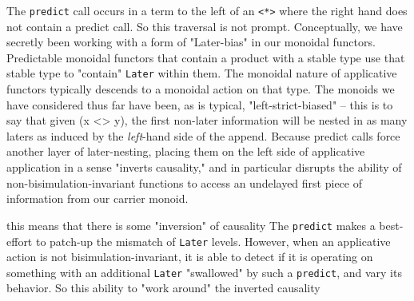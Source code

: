 \documentclass[hoptionsi,review,format=sigplan]{acmart}
\newcommand{\hs}{\texttt}
\begin{document}
The \hs{predict} call occurs in a term to the left of an \hs{<*>} where the right hand does not contain a predict call. So this traversal is not prompt. Conceptually, we have secretly been working with a form of "Later-bias" in our monoidal functors. Predictable monoidal functors that contain a product with a stable type use that stable type to "contain" \hs{Later} within them. The monoidal nature of applicative functors typically descends to a monoidal action on that type. The monoids we have considered thus far have been, as is typical, "left-strict-biased" -- this is to say that given (x <> y), the first non-later information will be nested in as many laters as induced by the \emph{left}-hand side of the append. Because predict calls force another layer of later-nesting, placing them on the left side of applicative application in a sense "inverts causality," and in particular disrupts the ability of non-bisimulation-invariant functions to access an undelayed first piece of information from our carrier monoid.

this means that there is some "inversion" of causality 
The \hs{predict} makes a best-effort to patch-up the mismatch of \hs{Later} levels. However, when an applicative action is not bisimulation-invariant, it is able to detect if it is operating on something with an additional \hs{Later} "swallowed" by such a \hs{predict}, and vary its behavior. So this ability to "work around" the inverted causality 




\end{document}
